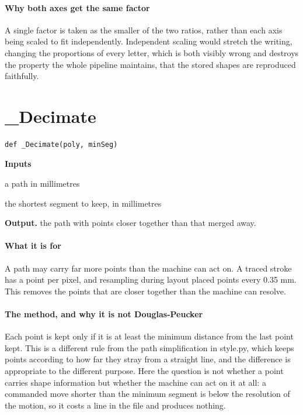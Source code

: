 \paragraph{Why both axes get the same factor}
A single factor is taken as the smaller of the two ratios, rather than each axis being scaled to fit independently. Independent scaling would stretch the writing, changing the proportions of every letter, which is both visibly wrong and destroys the property the whole pipeline maintains, that the stored shapes are reproduced faithfully.


\section{\_Decimate}
\begin{lstlisting}[style=sig]
def _Decimate(poly, minSeg)
\end{lstlisting}

\noindent\textbf{Inputs}
\begin{description}[leftmargin=2.2em,style=nextline,font=\normalfont\ttfamily]\setlength\itemsep{1pt}
  \item[{poly}] \normalfont a path in millimetres
  \item[{minSeg}] \normalfont the shortest segment to keep, in millimetres
\end{description}

\noindent\textbf{Output.} the path with points closer together than that merged away.


\paragraph{What it is for}
A path may carry far more points than the machine can act on. A traced stroke has a point per pixel, and resampling during layout placed points every 0.35 mm. This removes the points that are closer together than the machine can resolve.


\paragraph{The method, and why it is not Douglas-Peucker}
Each point is kept only if it is at least the minimum distance from the last point kept. This is a different rule from the path simplification in style.py, which keeps points according to how far they stray from a straight line, and the difference is appropriate to the different purpose. Here the question is not whether a point carries shape information but whether the machine can act on it at all: a commanded move shorter than the minimum segment is below the resolution of the motion, so it costs a line in the file and produces nothing.


